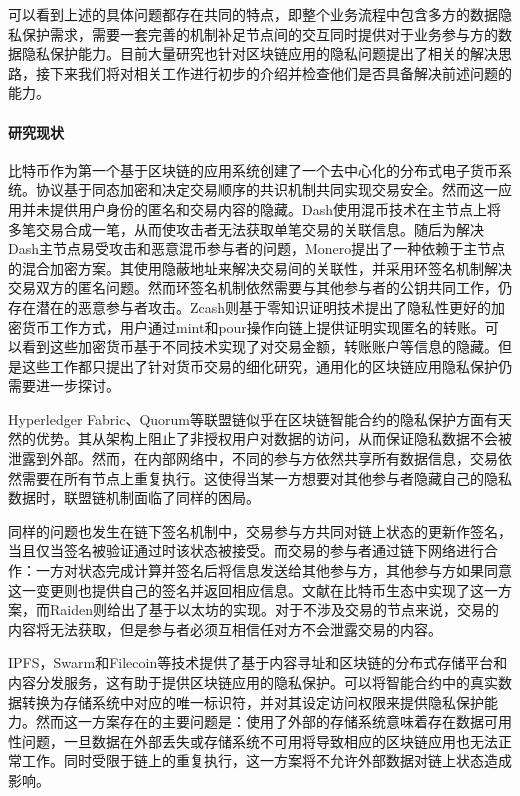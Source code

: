 可以看到上述的具体问题都存在共同的特点，即整个业务流程中包含多方的数据隐私保护需求，需要一套完善的机制补足节点间的交互同时提供对于业务参与方的数据隐私保护能力。目前大量研究也针对区块链应用的隐私问题提出了相关的解决思路，接下来我们将对相关工作进行初步的介绍并检查他们是否具备解决前述问题的能力。
\paragraph{研究现状}
比特币\cite{bitcoin}作为第一个基于区块链的应用系统创建了一个去中心化的分布式电子货币系统。协议基于同态加密和决定交易顺序的共识机制共同实现交易安全。然而这一应用并未提供用户身份的匿名和交易内容的隐藏。Dash\cite{Dash}使用混币技术在主节点上将多笔交易合成一笔，从而使攻击者无法获取单笔交易的关联信息。随后为解决Dash主节点易受攻击和恶意混币参与者的问题，Monero\cite{monero}提出了一种依赖于主节点的混合加密方案。其使用隐蔽地址来解决交易间的关联性，并采用环签名机制解决交易双方的匿名问题。然而环签名机制依然需要与其他参与者的公钥共同工作，仍存在潜在的恶意参与者攻击。Zcash\cite{Zcash}则基于零知识证明技术提出了隐私性更好的加密货币工作方式，用户通过mint和pour操作向链上提供证明实现匿名的转账。可以看到这些加密货币基于不同技术实现了对交易金额，转账账户等信息的隐藏。但是这些工作都只提出了针对货币交易的细化研究，通用化的区块链应用隐私保护仍需要进一步探讨。

Hyperledger Fabric\cite{androulaki2018hyperledger}、Quorum\cite{Quorum}等联盟链似乎在区块链智能合约的隐私保护方面有天然的优势。其从架构上阻止了非授权用户对数据的访问，从而保证隐私数据不会被泄露到外部。然而，在内部网络中，不同的参与方依然共享所有数据信息，交易依然需要在所有节点上重复执行。这使得当某一方想要对其他参与者隐藏自己的隐私数据时，联盟链机制面临了同样的困局。

同样的问题也发生在链下签名机制中，交易参与方共同对链上状态的更新作签名，当且仅当签名被验证通过时该状态被接受。而交易的参与者通过链下网络进行合作：一方对状态完成计算并签名后将信息发送给其他参与方，其他参与方如果同意这一变更则也提供自己的签名并返回相应信息。文献\cite{poon2016bitcoin}在比特币生态中实现了这一方案，而Raiden\cite{}则给出了基于以太坊的实现。对于不涉及交易的节点来说，交易的内容将无法获取，但是参与者必须互相信任对方不会泄露交易的内容。

IPFS\cite{benet2014ipfs}，Swarm\cite{swarm}和Filecoin\cite{Filecoin}等技术提供了基于内容寻址和区块链的分布式存储平台和内容分发服务，这有助于提供区块链应用的隐私保护。可以将智能合约中的真实数据转换为存储系统中对应的唯一标识符，并对其设定访问权限来提供隐私保护能力。然而这一方案存在的主要问题是：使用了外部的存储系统意味着存在数据可用性问题，一旦数据在外部丢失或存储系统不可用将导致相应的区块链应用也无法正常工作。同时受限于链上的重复执行，这一方案将不允许外部数据对链上状态造成影响。

